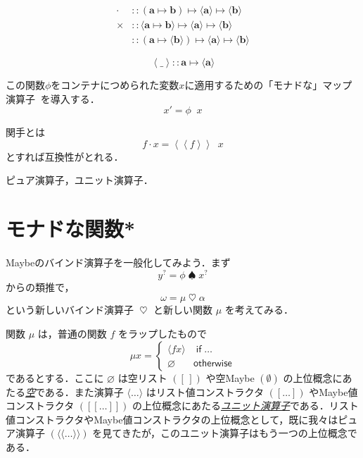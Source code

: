 \documentclass[a4paper]{jsbook}
\def\[{\left[\!\left[}
\def\]{\right]\!\right]}
\newcommand{\keyword}[1]{{\underline{\emph{#1}}}}
\newcommand{\mEmptyList}{{[\,]}}
\newcommand{\mNothing}{\emptyset}
\newcommand{\mPureNothing}{\varnothing}
\newcommand{\mKeyword}[1]{\mathsf{#1}}
\newcommand{\mIfKeyword}{\mKeyword{if}}
\newcommand{\mOtherwiseKeyword}{\mKeyword{otherwise}}
\newcommand{\mListWith}[1]{\left[#1\right]}
\newcommand{\mMaybeWith}[1]{\[#1\]}
\newcommand{\mPureWith}[1]{\langle\!\langle#1\rangle\!\rangle}
\newcommand{\mUnitWith}[1]{\langle#1\rangle}
\newcommand{\mMaybe}[1]{{#1}^\text{?}}
\DeclareMathOperator{\mBindMaybe}{\spadesuit}%
\DeclareMathOperator{\mBind}{\heartsuit}%
\DeclareMathOperator{\mIf}{\mIfKeyword}
\DeclareMathOperator{\mOtherwise}{\mOtherwiseKeyword}
\newcommand{\mathTypeParameter}[1]{\mathbf{#1}}
\newcommand{\mathPureWith}[1]{\left\langle#1\right\rangle}
\newcommand{\mathUnitWith}[1]{\left\langle\!\left\langle#1\right\rangle\!\right\rangle}
\newcommand{\mathAny}{\_}
\newcommand{\mathApplicativeGeneralMap}{\mathbin{\times}}
\newcommand{\mathGeneralMap}{\mathbin{\cdot}}
\newcommand{\mathIn}{\mathrel{::}}
\newcommand{\mathMapsTo}{\mapsto}
\newcommand{\mathMorph}[2]{#1\mathMapsTo#2}
\newcommand{\mathMorphII}[3]{#1\mathMapsTo#2\mathMapsTo#3}
\DeclareMathOperator{\hsklMonadMap}{{DO NOT USE}--\heartsuit}
\begin{document}
\begin{align*}
\mathGeneralMap&\mathIn{}\mathMorphII{(\mathMorph{\mathTypeParameter{a}}{\mathTypeParameter{b}})}{\langle\mathTypeParameter{a}\rangle}{\langle\mathTypeParameter{b}
\rangle}\\
\mathApplicativeGeneralMap&\mathIn{}\mathMorphII{\langle\mathMorph{\mathTypeParameter{a}}{\mathTypeParameter{b}}\rangle}{\langle\mathTypeParameter{a}\rangle}{\langle\mathTypeParameter{b}\rangle}\\
\hsklMonadMap&\mathIn{}\mathMorphII{(\mathMorph{\mathTypeParameter{a}}{\langle\mathTypeParameter{b}\rangle})}{\langle\mathTypeParameter{a}\rangle}{\langle{\mathTypeParameter{b}}\rangle}
\end{align*}

$$\mathPureWith{\mathAny}\mathIn\mathMorph{\mathTypeParameter{a}}{\langle\mathTypeParameter{a}\rangle}$$

この関数$\phi$をコンテナにつめられた変数$x$に適用するための「モナドな」マップ演算子$\hsklMonadMap$を導入する．
$$x'=\phi\hsklMonadMap x$$

関手とは
$$f\mathGeneralMap x=\mathUnitWith{f}\hsklMonadMap x$$
とすれば互換性がとれる．


ピュア演算子，ユニット演算子．


\section{モナドな関数*}

Maybeのバインド演算子を一般化してみよう．まず
\begin{equation}
\mMaybe{y}=\phi\mBindMaybe\mMaybe{x}
\end{equation}
からの類推で，
\begin{equation}
\omega=\mu\mBind\alpha
\end{equation}
という新しいバインド演算子 $\mBind$ と新しい関数 $\mu$ を考えてみる．

関数 $\mu$ は，普通の関数 $f$ をラップしたもので
\begin{equation}
\mu x=\begin{cases}
\mUnitWith{fx}&\mIf\dots\\
\mPureNothing&\mOtherwise
\end{cases}
\end{equation}
であるとする．ここに $\mPureNothing$ は空リスト $(\mEmptyList)$ や空Maybe $(\mNothing)$ の上位概念にあたる\keyword{空}である．また演算子 $\mUnitWith{\dots}$ はリスト値コンストラクタ $(\mListWith{\dots})$ やMaybe値コンストラクタ $(\mMaybeWith{\dots})$ の上位概念にあたる\keyword{ユニット演算子}である．リスト値コンストラクタやMaybe値コンストラクタの上位概念として，既に我々はピュア演算子 $(\mPureWith{\dots})$ を見てきたが，このユニット演算子はもう一つの上位概念である．
\end{document}
